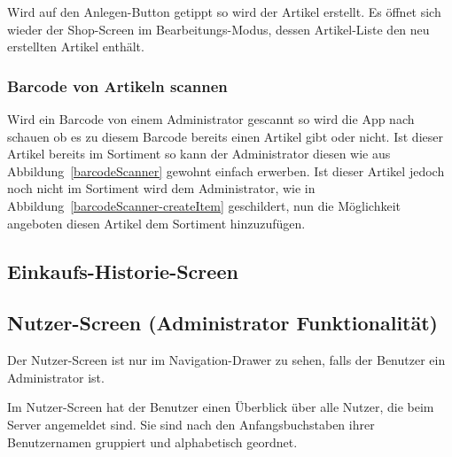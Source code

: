 Wird auf den Anlegen-Button getippt so wird der Artikel erstellt.
Es öffnet sich wieder der Shop-Screen im Bearbeitungs-Modus, dessen Artikel-Liste den neu erstellten Artikel enthält.


\subsubsection{Barcode von Artikeln scannen} \label{subsubsec:shop-admin-scan-item}

Wird ein Barcode von einem Administrator gescannt so wird die App nach schauen ob es zu diesem Barcode bereits einen Artikel gibt oder nicht.
Ist dieser Artikel bereits im Sortiment so kann der Administrator diesen wie aus Abbildung~\ref{barcodeScanner} gewohnt einfach erwerben.
Ist dieser Artikel jedoch noch nicht im Sortiment wird dem Administrator, wie in Abbildung~\ref{barcodeScanner-createItem} geschildert, nun die Möglichkeit angeboten diesen Artikel dem Sortiment hinzuzufügen.


\subsection{Einkaufs-Historie-Screen} \label{subsec:purchases-screen}


\subsection{Nutzer-Screen (Administrator Funktionalität)} \label{subsec:user-screen}

Der Nutzer-Screen ist nur im Navigation-Drawer zu sehen, falls der Benutzer ein Administrator ist.

Im Nutzer-Screen hat der Benutzer einen Überblick über alle Nutzer, die beim Server angemeldet sind.
Sie sind nach den Anfangsbuchstaben ihrer Benutzernamen gruppiert und alphabetisch geordnet.

